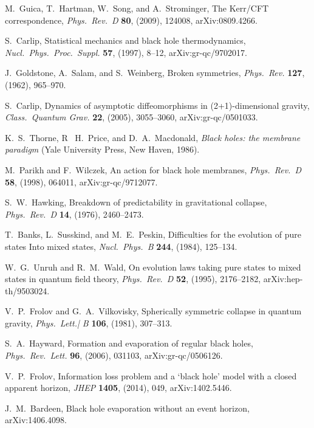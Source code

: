 \documentclass[12pt]{article}
\begin{document}
\begin{thebibliography}{999}
 M.\ Guica, T.\ Hartman, W.\ Song, and A.\ Strominger,
The Kerr/CFT correspondence, \emph{Phys.\ Rev.\ D} {\bf 80}, 
(2009), 124008, arXiv:0809.4266. 

 S.\ Carlip, Statistical mechanics and 
black hole thermodynamics, \emph{Nucl.\ Phys.\ Proc.\ Suppl.}
{\bf 57}, (1997), 8--12, arXiv:gr-qc/9702017.

  J.\ Goldstone, A.\ Salam, and S.\ Weinberg, 
Broken symmetries, \emph{Phys.\ Rev.} {\bf 127}, (1962), 965--970.

 S.\ Carlip, Dynamics of asymptotic diffeomorphisms 
in (2+1)-dimensional gravity, \emph{Class.\ Quantum Grav.} {\bf 22},
(2005), 3055--3060, arXiv:gr-qc/0501033.

  K.~S.\ Thorne, R~ H.\ Price, and D.~A.\ Macdonald,
\emph{Black holes: the membrane paradigm} (Yale University Press, 
New Haven, 1986).

 M.\ Parikh and F.\ Wilczek, An action for black hole 
membranes, \emph{Phys.\ Rev.\ D} {\bf 58}, (1998), 064011,
arXiv:gr-qc/9712077.

 S.~W.\ Hawking, Breakdown of predictability 
in gravitational collapse, \emph{Phys.\ Rev.\ D} {\bf 14}, (1976),
2460--2473.

 T.\ Banks, L.\ Susskind, and M.~E.\ Peskin, 
Difficulties for the evolution of pure states Into mixed states,
\emph{Nucl.\ Phys.\ B} {\bf 244}, (1984), 125--134.

 W.~G.\ Unruh and R.~M.\ Wald, On evolution 
laws taking pure states to mixed states in quantum field theory,
\emph{Phys.\ Rev.\ D} {\bf 52},  (1995), 2176--2182, 
arXiv:hep-th/9503024.

 V.~P.\ Frolov and G.~A.\ Vilkovisky,
Spherically symmetric collapse in quantum gravity,
\emph{Phys.\ Lett.| B} {\bf 106}, (1981), 307--313.

 S.~A.\ Hayward, Formation and evaporation 
of regular black holes, \emph{Phys.\ Rev.\ Lett.} {\bf 96}, (2006), 
031103, arXiv:gr-qc/0506126.

 V.~P.\ Frolov, Information loss problem and 
a `black hole' model with a closed apparent horizon, 
\emph{JHEP} {\bf 1405}, (2014), 049, arXiv:1402.5446.

  J.~M.\ Bardeen, Black hole evaporation 
without an event horizon,  arXiv:1406.4098.


\end{thebibliography}
\end{document}
